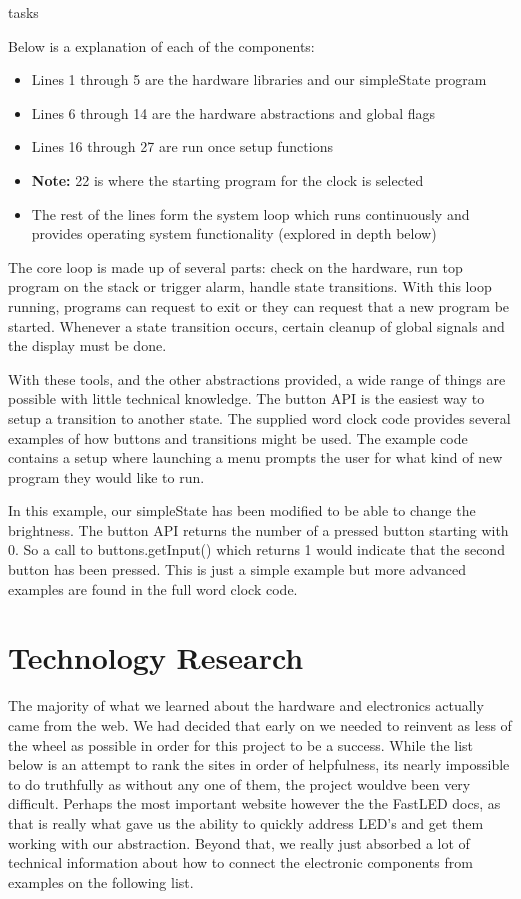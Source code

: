 tasks\documentclass[onecolumn, draftclsnofoot,10pt, compsoc]{IEEEtran}
\begin{document}


Below is a explanation of each of the components:
\begin{itemize}
	\item Lines 1 through 5 are the hardware libraries and our simpleState program
	\item Lines 6 through 14 are the hardware abstractions and global flags
	\item Lines 16 through 27 are run once setup functions
	\item \textbf{Note:} 22 is where the starting program for the clock is selected
	\item The rest of the lines form the system loop which runs continuously and provides operating system functionality (explored in depth below)
\end{itemize}

The core loop is made up of several parts: check on the hardware, run top program on the stack or trigger alarm, handle state transitions.
With this loop running, programs can request to exit or they can request that a new program be started.
Whenever a state transition occurs, certain cleanup of global signals and the display must be done.

With these tools, and the other abstractions provided, a wide range of things are possible with little technical knowledge.
The button API is the easiest way to setup a transition to another state.
The supplied word clock code provides several examples of how buttons and transitions might be used.
The example code contains a setup where launching a menu prompts the user for what kind of new program they would like to run.



In this example, our simpleState has been modified to be able to change the brightness.
The button API returns the number of a pressed button starting with 0.
So a call to buttons.getInput() which returns 1 would indicate that the second button has been pressed.
This is just a simple example but more advanced examples are found in the full word clock code.

\section{Technology Research}
The majority of what we learned about the hardware and electronics actually came from the web.
We had decided that early on we needed to reinvent as less of the wheel as possible in order for this project to be a success.
While the list below is an attempt to rank the sites in order of helpfulness, its nearly impossible to do truthfully as without any one of them, the project wouldve been very difficult.
Perhaps the most important website however the the FastLED docs, as that is really what gave us the ability to quickly address LED's and get them working with our abstraction.
Beyond that, we really just absorbed a lot of technical information about how to connect the electronic components from examples on the following list.
\end{document}
